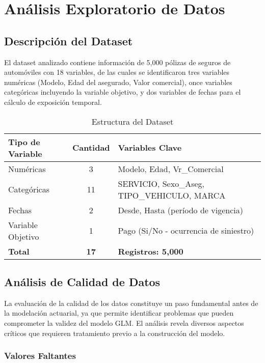 \section{Análisis Exploratorio de Datos}

\subsection{Descripción del Dataset}

El dataset analizado contiene información de 5,000 pólizas de seguros de automóviles con 18 variables, de las cuales se identificaron tres variables numéricas (Modelo, Edad del asegurado, Valor comercial), once variables categóricas incluyendo la variable objetivo, y dos variables de fechas para el cálculo de exposición temporal.

\begin{table}[H]
\centering
\caption{Estructura del Dataset}
\begin{tabular}{|l|c|l|}
\hline
\textbf{Tipo de Variable} & \textbf{Cantidad} & \textbf{Variables Clave} \\
\hline
Numéricas & 3 & Modelo, Edad, Vr\_Comercial \\
Categóricas & 11 & SERVICIO, Sexo\_Aseg, TIPO\_VEHICULO, MARCA \\
Fechas & 2 & Desde, Hasta (período de vigencia) \\
Variable Objetivo & 1 & Pago (Si/No - ocurrencia de siniestro) \\
\hline
\textbf{Total} & \textbf{17} & \textbf{Registros: 5,000} \\
\hline
\end{tabular}
\end{table}

\subsection{Análisis de Calidad de Datos}

La evaluación de la calidad de los datos constituye un paso fundamental antes de la modelación actuarial, ya que permite identificar problemas que pueden comprometer la validez del modelo GLM. El análisis revela diversos aspectos críticos que requieren tratamiento previo a la construcción del modelo.

\subsubsection{Valores Faltantes}

